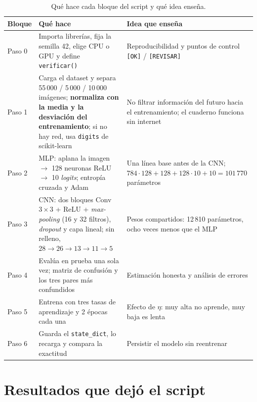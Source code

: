 \documentclass[11pt,letterpaper]{article}
\begin{document}
\begin{table}[H]
\centering\small
\caption{Qué hace cada bloque del script y qué idea enseña.}
\begin{tabularx}{\linewidth}{@{}l L L@{}}
\toprule
Bloque & Qué hace & Idea que enseña \\
\midrule
Paso 0 & Importa librerías, fija la semilla 42, elige CPU o GPU y define \texttt{verificar()} & Reproducibilidad y puntos de control \texttt{[OK]} / \texttt{[REVISAR]} \\
Paso 1 & Carga el dataset y separa 55\,000 / 5\,000 / 10\,000 imágenes; \textbf{normaliza con la media y la desviación del entrenamiento}; si no hay red, usa \texttt{digits} de scikit-learn & No filtrar información del futuro hacia el entrenamiento; el cuaderno funciona sin internet \\
Paso 2 & MLP: aplana la imagen $\to$ 128 neuronas ReLU $\to$ 10 \textit{logits}; entropía cruzada y Adam & Una línea base antes de la CNN; $784\cdot128+128+128\cdot10+10=101\,770$ parámetros \\
Paso 3 & CNN: dos bloques Conv $3\times3$ + ReLU + \textit{max-pooling} (16 y 32 filtros), \textit{dropout} y capa lineal; sin relleno, $28\to26\to13\to11\to5$ & Pesos compartidos: 12\,810 parámetros, ocho veces menos que el MLP \\
Paso 4 & Evalúa en prueba una sola vez; matriz de confusión y los tres pares más confundidos & Estimación honesta y análisis de errores \\
Paso 5 & Entrena con tres tasas de aprendizaje y 2 épocas cada una & Efecto de $\eta$: muy alta no aprende, muy baja es lenta \\
Paso 6 & Guarda el \texttt{state\_dict}, lo recarga y compara la exactitud & Persistir el modelo sin reentrenar \\
\bottomrule
\end{tabularx}
\end{table}

\section{Resultados que dejó el script}
\end{document}
